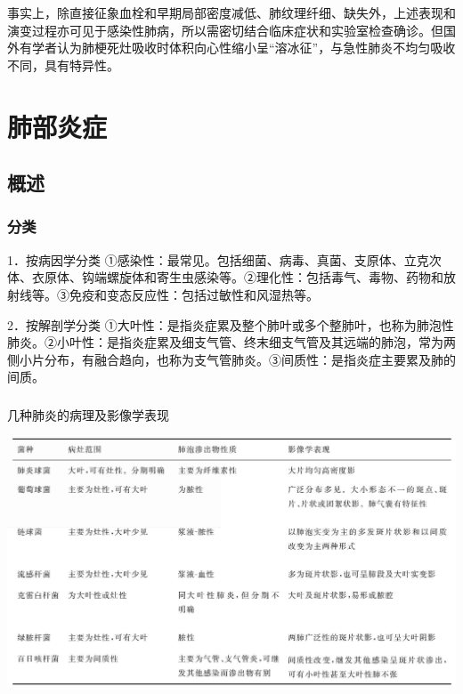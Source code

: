 事实上，除直接征象血栓和早期局部密度减低、肺纹理纤细、缺失外，上述表现和演变过程亦可见于感染性肺病，所以需密切结合临床症状和实验室检查确诊。但国外有学者认为肺梗死灶吸收时体积向心性缩小呈“溶冰征”，与急性肺炎不均匀吸收不同，具有特异性。

\section{肺部炎症}

\subsection{概述}

\subsubsection{分类}

1．按病因学分类
①感染性：最常见。包括细菌、病毒、真菌、支原体、立克次体、衣原体、钩端螺旋体和寄生虫感染等。②理化性：包括毒气、毒物、药物和放射线等。③免疫和变态反应性：包括过敏性和风湿热等。

2．按解剖学分类
①大叶性：是指炎症累及整个肺叶或多个整肺叶，也称为肺泡性肺炎。②小叶性：是指炎症累及细支气管、终末细支气管及其远端的肺泡，常为两侧小片分布，有融合趋向，也称为支气管肺炎。③间质性：是指炎症主要累及肺的间质。

\subsubsection{}

\begin{table}[htbp]
\centering
\caption{几种肺炎的病理及影像学表现}
\label{tab9-4}
\includegraphics[width=\textwidth,height=\textheight,keepaspectratio]{./images/Image00200.jpg}
\end{table}

